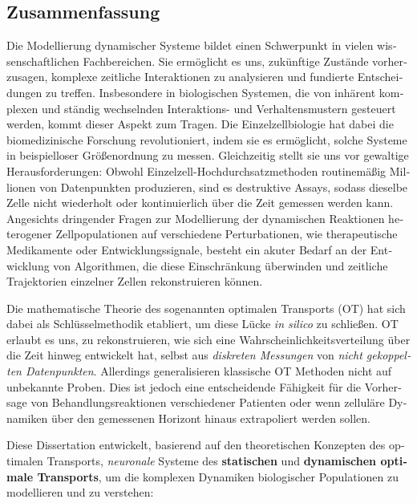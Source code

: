 \begin{otherlanguage}{ngerman}
\chapter*{Zusammenfassung}

Die Modellierung dynamischer Systeme bildet einen Schwerpunkt in vielen wissenschaftlichen Fachbereichen. Sie erm{\"o}glicht es uns, zuk{\"u}nftige Zust{\"a}nde vorherzusagen, komplexe zeitliche Interaktionen zu analysieren und fundierte Entscheidungen zu treffen. Insbesondere in biologischen Systemen, die von inh{\"a}rent komplexen und st{\"a}ndig wechselnden Interaktions- und Verhaltensmustern gesteuert werden, kommt dieser Aspekt zum Tragen.
Die Einzelzellbiologie hat dabei die biomedizinische Forschung revolutioniert, indem sie es erm{\"o}glicht, solche Systeme in beispielloser Gr{\"o}{\ss}enordnung zu messen. Gleichzeitig stellt sie uns vor gewaltige Herausforderungen: Obwohl Einzelzell-Hochdurchsatzmethoden routinem{\"a}{\ss}ig Millionen von Datenpunkten produzieren, sind es destruktive Assays, sodass dieselbe Zelle nicht wiederholt oder kontinuierlich {\"u}ber die Zeit gemessen werden kann.
Angesichts dringender Fragen zur Modellierung der dynamischen Reaktionen heterogener Zellpopulationen auf verschiedene Perturbationen, wie therapeutische Medikamente oder Entwicklungssignale, besteht ein akuter Bedarf an der Entwicklung von Algorithmen, die diese Einschr{\"a}nkung {\"u}berwinden und zeitliche Trajektorien einzelner Zellen rekonstruieren k{\"o}nnen.

Die mathematische Theorie des sogenannten optimalen Transports (\acrshort{OT}) hat sich dabei als Schl{\"u}sselmethodik etabliert, um diese L{\"u}cke \emph{in silico} zu schlie{\ss}en. \acrshort{OT} erlaubt es uns, zu rekonstruieren, wie sich eine Wahrscheinlichkeitsverteilung {\"u}ber die Zeit hinweg entwickelt hat, selbst aus \textit{diskreten Messungen} von \textit{nicht gekoppelten Datenpunkten}. Allerdings generalisieren klassische \acrshort{OT} Methoden nicht auf unbekannte Proben. Dies ist jedoch eine entscheidende F{\"a}higkeit f{\"u}r die Vorhersage von Behandlungsreaktionen verschiedener Patienten oder wenn zellul{\"a}re Dynamiken {\"u}ber den gemessenen Horizont hinaus extrapoliert werden sollen.

Diese Dissertation entwickelt, basierend auf den theoretischen Konzepten des optimalen Transports, \textit{neuronale} Systeme des \textbf{statischen} und \textbf{dynamischen optimale Transports}, um die komplexen Dynamiken biologischer Populationen zu modellieren und zu verstehen:


\end{otherlanguage}
